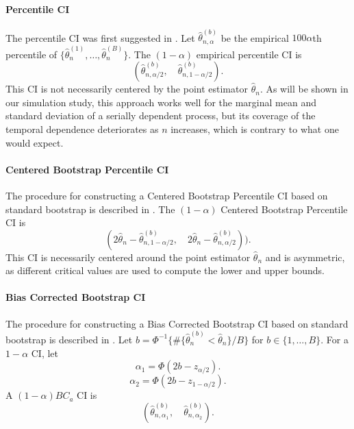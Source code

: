 \documentclass[12pt, letterpaper, titlepage]{article}
\begin{document}
\paragraph{Percentile CI}
The percentile CI was first suggested in \citet{efron1979bootstrap}.
Let $\hat\theta_{n, \alpha}^{(b)}$ be the empirical $100\alpha$th percentile of
$\{\hat\theta_n^{(1)}, \ldots, \hat\theta_n^{(B)}\}$. The $(1 - \alpha)$
empirical percentile CI is
\[
(\hat\theta_{n, \alpha/2}^{(b)}, \quad \hat\theta_{n, 1 - \alpha/2}^{(b)}).
\]
This CI is not necessarily centered by the point estimator $\hat\theta_n$.
As will be shown in our simulation study, this approach works well for the
marginal mean and standard deviation of a serially dependent process, but its
coverage of the temporal dependence deteriorates as $n$ increases, which is
contrary to what one would expect.

\paragraph{Centered Bootstrap Percentile CI}
The procedure for constructing a Centered Bootstrap Percentile CI based on standard bootstrap is
described in \citet{singh2008bootstrap}.
The $(1 - \alpha)$ Centered Bootstrap Percentile CI is
\[
(2\hat{\theta}_{n} - \hat\theta_{n, 1 - \alpha/2}^{(b)}, \quad
2\hat{\theta}_{n} - \hat\theta_{n, \alpha/2}^{(b)})).
\]
This CI is necessarily centered around the point estimator $\hat\theta_n$ and
is asymmetric, as different critical values are used to compute
the lower and upper bounds.



\paragraph{Bias Corrected Bootstrap CI}
The procedure for constructing a Bias Corrected Bootstrap CI based on standard bootstrap is
described in \citet{carpenter2000bootstrap}.
Let $b = \Phi^{-1}\{\#\{\hat\theta_n^{(b)} < \hat{\theta}_n\} / B\}$
for $b \in \{1, \ldots, B\}$. 
For a $1 - \alpha$ CI, let
\[
\alpha_1 = \Phi(2b - z_{\alpha/2}).
\]
\[
\alpha_2 = \Phi(2b - z_{1 - \alpha/2}).
\]
A $(1 - \alpha) BC_a$ CI is
\[
(\hat\theta_{n, \alpha_1}^{(b)}, \quad \hat\theta_{n, \alpha_2}^{(b)}).
\]
\end{document}
